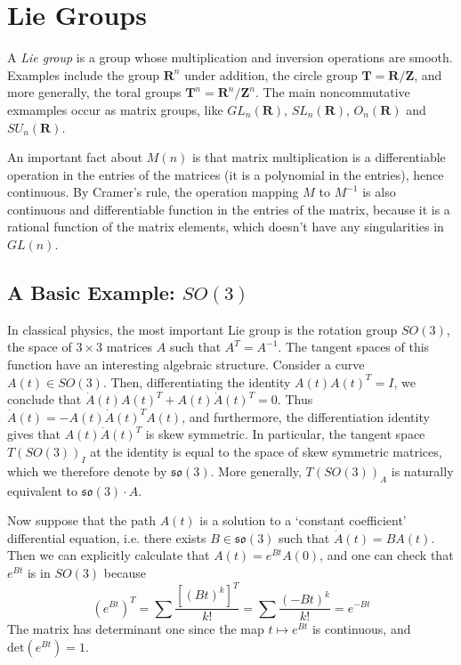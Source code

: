 \chapter{Lie Groups}

A \emph{Lie group} is a group whose multiplication and inversion operations are smooth. Examples include the group $\mathbf{R}^n$ under addition, the circle group $\mathbf{T} = \mathbf{R}/\mathbf{Z}$, and more generally, the toral groups $\mathbf{T}^n = \mathbf{R}^n / \mathbf{Z}^n$. The main noncommutative exmamples occur as matrix groups, like $GL_n(\mathbf{R})$, $SL_n(\mathbf{R})$, $O_n(\mathbf{R})$ and $SU_n(\mathbf{R})$.

An important fact about $M(n)$ is that matrix multiplication is a differentiable operation in the entries of the matrices (it is a polynomial in the entries), hence continuous. By Cramer's rule, the operation mapping $M$ to $M^{-1}$ is also continuous and differentiable function in the entries of the matrix, because it is a rational function of the matrix elements, which doesn't have any singularities in $GL(n)$.

\section{A Basic Example: $SO(3)$}

In classical physics, the most important Lie group is the rotation group $SO(3)$, the space of $3 \times 3$ matrices $A$ such that $A^T = A^{-1}$. The tangent spaces of this function have an interesting algebraic structure. Consider a curve $A(t) \in SO(3)$. Then, differentiating the identity $A(t) A(t)^T = I$, we conclude that $\dot{A}(t) A(t)^T + A(t) \dot{A}(t)^T = 0$. Thus $\dot{A}(t) = - A(t) \dot{A}(t)^T A(t)$, and furthermore, the differentiation identity gives that $A(t) \dot{A}(t)^T$ is skew symmetric. In particular, the tangent space $T(SO(3))_I$ at the identity is equal to the space of skew symmetric matrices, which we therefore denote by $\mathfrak{so}(3)$. More generally, $T(SO(3))_A$ is naturally equivalent to $\mathfrak{so}(3) \cdot A$.

Now suppose that the path $A(t)$ is a solution to a `constant coefficient' differential equation, i.e. there exists $B \in \mathfrak{so}(3)$ such that $\dot{A}(t) = B A(t)$. Then we can explicitly calculate that $A(t) = e^{Bt} A(0)$, and one can check that $e^{Bt}$ is in $SO(3)$ because
%
\[ (e^{Bt})^T = \sum \frac{[(Bt)^k]^T}{k!} = \sum \frac{(-Bt)^k}{k!} = e^{-Bt} \]
%
The matrix has determinant one since the map $t \mapsto e^{Bt}$ is continuous, and $\text{det}(e^{Bt}) = 1$.

